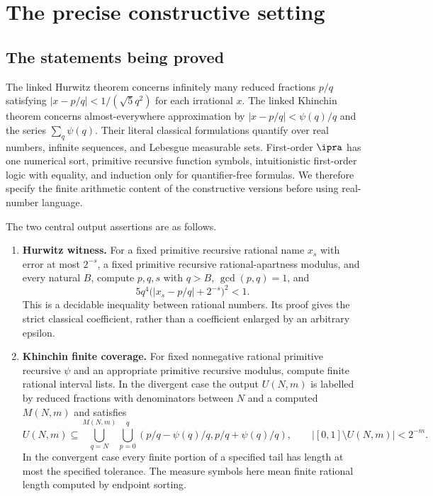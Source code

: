 \section{The precise constructive setting}
\label{sec:foundations}

\subsection{The statements being proved}

The linked Hurwitz theorem concerns infinitely many reduced fractions
$p/q$ satisfying $|x-p/q|<1/(\sqrt5 q^2)$ for each irrational $x$.
The linked Khinchin theorem concerns almost-everywhere approximation by
$|x-p/q|<\psi(q)/q$ and the series $\sum_q\psi(q)$.
Their literal classical formulations quantify over real numbers, infinite
sequences, and Lebesgue measurable sets.  First-order $\ipra$ has one
numerical sort, primitive recursive function symbols, intuitionistic
first-order logic with equality, and induction only for quantifier-free
formulas.  We therefore specify the finite arithmetic content of the
constructive versions before using real-number language.

The two central output assertions are as follows.
\begin{enumerate}
\item \textbf{Hurwitz witness.} For a fixed primitive recursive rational
name $x_s$ with error at most $2^{-s}$, a fixed primitive recursive
rational-apartness modulus, and every natural $B$, compute $p,q,s$ with
$q>B$, $\gcd(p,q)=1$, and
\[
 5q^4\bigl(|x_s-p/q|+2^{-s}\bigr)^2<1.
\]
This is a decidable inequality between rational numbers.  Its proof gives
the strict classical coefficient, rather than a coefficient enlarged by
an arbitrary epsilon.
\item \textbf{Khinchin finite coverage.} For fixed nonnegative rational
primitive recursive $\psi$ and an appropriate primitive recursive modulus,
compute finite rational interval lists.  In the divergent case the
output $U(N,m)$ is labelled by reduced fractions with denominators
between $N$ and a computed $M(N,m)$ and satisfies
\[
 U(N,m)\subseteq\bigcup_{q=N}^{M(N,m)}
       \bigcup_{p=0}^q (p/q-\psi(q)/q,p/q+\psi(q)/q),
 \qquad |[0,1]\setminus U(N,m)|<2^{-m}.
\]
In the convergent case every finite portion of a specified tail has
length at most the specified tolerance.  The measure symbols here mean
finite rational length computed by endpoint sorting.
\end{enumerate}

